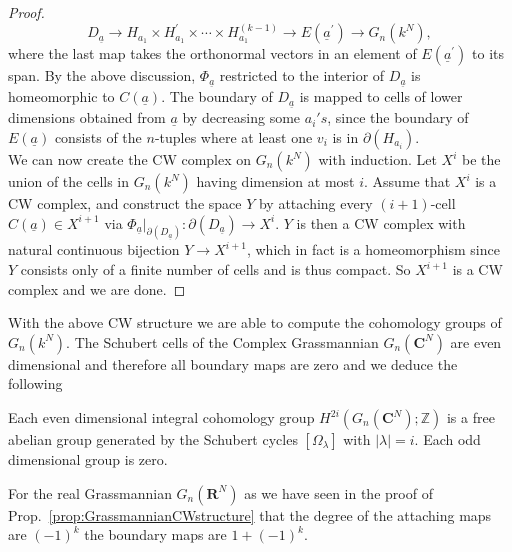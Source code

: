 \documentclass[a4paper,openany]{scrbook}
\begin{document}
\begin{proof}
$$
D_{\underline{a}}\rightarrow H_{a_1}\times H^\prime_{a_1}\times \cdots \times H^{(k-1)}_{a_1}\rightarrow E(\underline{a}^\prime)\rightarrow G_n(k^N),
$$
where the last map takes the orthonormal vectors in an element of $E(\underline{a}^\prime)$ to its span. By the above discussion, $\Phi_{\underline{a}}$ restricted to the interior of $D_{\underline{a}}$ is homeomorphic to $C(\underline{a})$. The boundary of $D_{\underline{a}}$ is mapped to cells of lower dimensions obtained from $\underline{a}$ by decreasing some $a_i's$,  since the boundary of $E(\underline{a})$ consists of the $n$-tuples where at least one $v_i$ is in $\partial(H_{a_i})$.\\
We can now create the CW complex on $G_n(k^N)$ with induction. Let $X^i$ be the union of the cells in $G_n(k^N)$ having dimension at most $i$. Assume that $X^i$ is a CW complex, and construct the space $Y$ by attaching every $(i+1)$-cell $C(\underline{a})\in X^{i+1}$ via $\Phi_{\underline{a}}\vert_{\partial(D_{\underline{a}})}:\partial(D_{\underline{a}}) \rightarrow X^i$. $Y$ is then a CW complex with natural continuous bijection $Y\rightarrow X^{i+1}$, which in fact is a homeomorphism since $Y$ consists only of a finite number of cells and is thus compact. So $X^{i+1}$ is a CW complex and we are done.
\end{proof}
With the above CW structure we are able to compute the cohomology groups of $G_n(k^N)$.
The Schubert cells of the Complex Grassmannian $G_n(\mathbf{C}^N)$ are even dimensional and therefore all boundary maps are zero and we deduce the following
\begin{thm}
Each even dimensional integral cohomology group $H^{2i}(G_n(\mathbf{C}^N) ;\mathbb{Z})$ is a free abelian group generated by the Schubert cycles $\left[\Omega_\lambda \right]$ with $|\lambda | =i$. Each odd dimensional group is zero.
\end{thm}
\begin{remark}
For the real Grassmannian $G_n(\mathbf{R}^N)$ as we have seen in the proof of Prop.~\ref{prop:GrassmannianCWstructure} that the degree of the attaching maps are $(-1)^k$ the boundary maps are $1+(-1)^k$. 
\end{remark}
\end{document}
